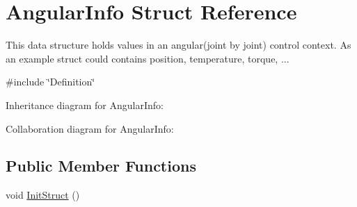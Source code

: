 \hypertarget{struct_angular_info}{}\section{Angular\+Info Struct Reference}
\label{struct_angular_info}


This data structure holds values in an angular(joint by joint) control context. As an example struct could contains position, temperature, torque, ...  




{\ttfamily \#include \char`\"{}Definition\char`\"{}}



Inheritance diagram for Angular\+Info\+:


Collaboration diagram for Angular\+Info\+:
\subsection*{Public Member Functions}
\begin{DoxyCompactItemize}
\item 
void \hyperlink{struct_angular_info_a092156b3e0e6cb657ed4bb2f6b15a9f0}{Init\+Struct} ()
\end{DoxyCompactItemize}
